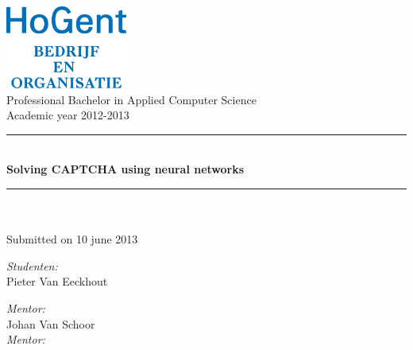 \documentclass[pdftex,a4paper,12pt,twoside]{report}
\newcommand{\HRule}{\rule{\linewidth}{0.5mm}}
\newcommand{\studenta}{Pieter {Van Eeckhout}}
\newcommand{\begeleider}{Johan {Van Schoor}}
\newcommand{\titel}{Solving CAPTCHA using neural networks}
\newcommand{\ondertitel}{}
\newcommand{\datum}{10 june 2013}
\newcommand{\academiejaar}{2012-2013}
\begin{document}

\begin{titlepage}
\begin{center}
\includegraphics[width=4cm]{./img/FBO-NL.jpg}\\[.5cm]



Professional Bachelor in Applied Computer Science\\
Academic year \academiejaar

\vfill

\HRule \\[0.4cm]
{ \huge \bfseries \titel}\\[0.4cm]
\HRule \\[0.4cm]

{\Large \ondertitel}\\[0.4cm]

Submitted on \datum

\vfill

\begin{minipage}{0.49\textwidth}
\begin{flushleft}
\emph{Student\ifdefined\studentb en\fi :}\\
\studenta \\
\ifdefined\studentb \studentb \fi\par
\end{flushleft}
\end{minipage}
\begin{minipage}{0.49\textwidth}
\begin{flushright}
\emph{Mentor:}\\ \begeleider\\
\ifdefined\mentor \emph{Mentor:}\\ \mentor \fi
\end{flushright}
\end{minipage}

\end{center}

\end{titlepage}
\end{document}
